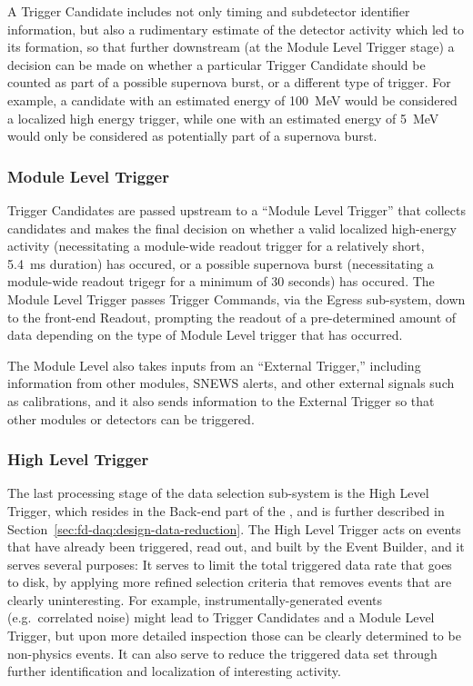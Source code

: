 A Trigger Candidate includes not only timing and subdetector
identifier information, but also a rudimentary estimate of the detector
activity which led to its formation, so that further downstream (at
the Module Level Trigger stage) a decision can be made on 
whether a particular Trigger Candidate should be counted as part of a possible supernova
burst, or a different type of trigger. For example,
a candidate with an estimated energy of 100~MeV would be considered a
localized high energy trigger, while
one with an estimated energy of 5~MeV would only be considered as potentially part of a
supernova burst.

\subsubsection{Module Level Trigger}
Trigger Candidates are passed upstream to a “Module Level Trigger'' that collects candidates
and makes the final decision on whether a valid localized high-energy
activity (necessitating a module-wide readout trigger for a relatively
short, 5.4~ms duration) has occured,
or a possible supernova burst (necessitating a module-wide readout
trigegr for a minimum of 30 seconds) has occured. The Module Level Trigger passes
Trigger Commands, via the Egress sub-system, down to the front-end 
Readout, prompting the readout of a pre-determined amount of data depending
on the type of Module Level trigger that has occurred. 

The Module Level also takes inputs 
from an “External Trigger,” including information from other
modules, SNEWS alerts, and other external signals such as
calibrations, 
and it also sends information to the External Trigger so that other modules or
detectors can be triggered.

\subsubsection{High Level Trigger}

The last processing stage of the data selection sub-system is the High
Level Trigger, which resides in the
Back-end part of the , and is further described in Section~\ref{sec:fd-daq:design-data-reduction}. The High Level Trigger acts on events that have already been triggered, read out,
and built by the Event Builder, and it serves several purposes: It
serves to limit the total triggered data rate that goes to disk, by
applying more refined selection criteria that removes events that are clearly uninteresting. For example, instrumentally-generated events
(e.g.~correlated noise) might lead to Trigger Candidates and a Module
Level Trigger, but upon more detailed inspection those can be clearly determined
to be non-physics events. It can also serve to reduce the triggered
data set through further identification and localization of
interesting activity.

